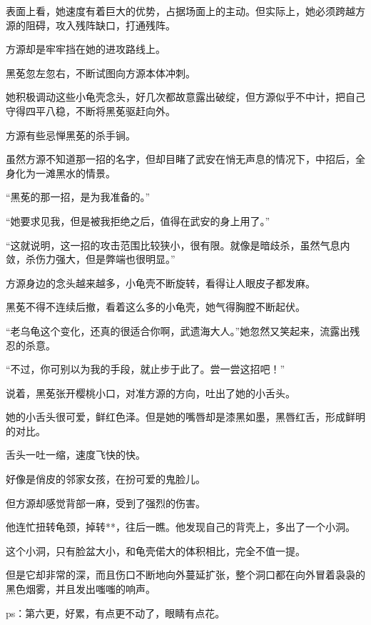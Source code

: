 \begin{this_body}
表面上看，她速度有着巨大的优势，占据场面上的主动。但实际上，她必须跨越方源的阻碍，攻入残阵缺口，打通残阵。

方源却是牢牢挡在她的进攻路线上。

黑莬忽左忽右，不断试图向方源本体冲刺。

她积极调动这些小龟壳念头，好几次都故意露出破绽，但方源似乎不中计，把自己守得四平八稳，不断将黑莬驱赶向外。

方源有些忌惮黑莬的杀手锏。

虽然方源不知道那一招的名字，但却目睹了武安在悄无声息的情况下，中招后，全身化为一滩黑水的情景。

“黑莬的那一招，是为我准备的。”

“她要求见我，但是被我拒绝之后，值得在武安的身上用了。”

“这就说明，这一招的攻击范围比较狭小，很有限。就像是暗歧杀，虽然气息内敛，杀伤力强大，但是弊端也很明显。”

方源身边的念头越来越多，小龟壳不断旋转，看得让人眼皮子都发麻。

黑莬不得不连续后撤，看着这么多的小龟壳，她气得胸膛不断起伏。

“老乌龟这个变化，还真的很适合你啊，武遗海大人。”她忽然又笑起来，流露出残忍的杀意。

“不过，你可别以为我的手段，就止步于此了。尝一尝这招吧！”

说着，黑莬张开樱桃小口，对准方源的方向，吐出了她的小舌头。

她的小舌头很可爱，鲜红色泽。但是她的嘴唇却是漆黑如墨，黑唇红舌，形成鲜明的对比。

舌头一吐一缩，速度飞快的快。

好像是俏皮的邻家女孩，在扮可爱的鬼脸儿。

但方源却感觉背部一麻，受到了强烈的伤害。

他连忙扭转龟颈，掉转**，往后一瞧。他发现自己的背壳上，多出了一个小洞。

这个小洞，只有脸盆大小，和龟壳偌大的体积相比，完全不值一提。

但是它却非常的深，而且伤口不断地向外蔓延扩张，整个洞口都在向外冒着袅袅的黑色烟雾，并且发出嗤嗤的响声。

ps：第六更，好累，有点更不动了，眼睛有点花。

\end{this_body}

